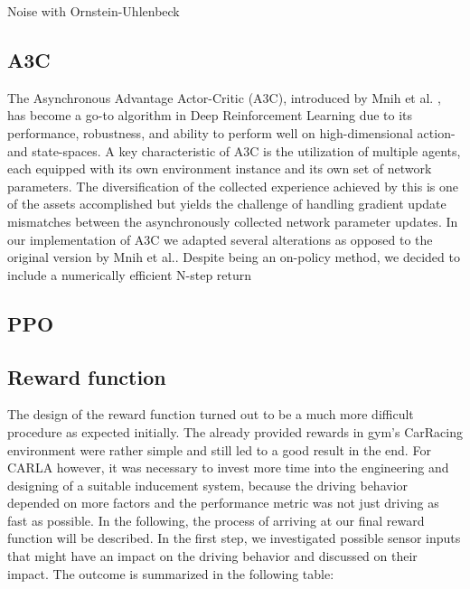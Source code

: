 \documentclass[letterpaper, 10 pt, conference]{ieeeconf}  %
\begin{document}
Noise with Ornstein-Uhlenbeck

\subsection{A3C}
The Asynchronous Advantage Actor-Critic (A3C), introduced by Mnih et al. \cite{mnihAsynchronousMethodsDeep2016}, has become a go-to algorithm in 
Deep Reinforcement Learning due to its performance, robustness, and ability to perform well on high-dimensional action- and state-spaces. 
A key characteristic of A3C is the utilization of multiple agents, each equipped with its own environment instance and its own set of network parameters. 
The diversification of the collected experience achieved by this is one of the assets accomplished but yields the challenge of handling gradient update 
mismatches between the asynchronously collected network parameter updates. 
In our implementation of A3C we adapted several alterations as opposed to the original version by Mnih et al.. Despite being an on-policy method, we decided 
to include a numerically efficient N-step return 

\subsection{PPO}
\subsection{Reward function}
The design of the reward function turned out to be a much more difficult procedure as expected initially. The already provided rewards in gym's CarRacing environment were rather simple and still led to a good result in the end. For CARLA however, it was necessary to invest more time into the engineering and designing of a suitable inducement system, because the driving behavior depended on more factors and the performance metric was not just driving as fast as possible. In the following, the process of arriving at our final reward function will be described. \newline 
In the first step, we investigated possible sensor inputs that might have an impact on the driving behavior and discussed on their impact. The outcome is summarized in the following table:
\newline 
\end{document}
